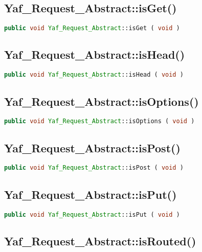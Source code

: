 \subsection{Yaf\_Request\_Abstract::isGet()}




\begin{lstlisting}[language=PHP]
public void Yaf_Request_Abstract::isGet ( void )
\end{lstlisting}




\subsection{Yaf\_Request\_Abstract::isHead()}



\begin{lstlisting}[language=PHP]
public void Yaf_Request_Abstract::isHead ( void )
\end{lstlisting}


\subsection{Yaf\_Request\_Abstract::isOptions()}





\begin{lstlisting}[language=PHP]
public void Yaf_Request_Abstract::isOptions ( void )
\end{lstlisting}


\subsection{Yaf\_Request\_Abstract::isPost()}

\begin{lstlisting}[language=PHP]
public void Yaf_Request_Abstract::isPost ( void )
\end{lstlisting}

\subsection{Yaf\_Request\_Abstract::isPut()}

\begin{lstlisting}[language=PHP]
public void Yaf_Request_Abstract::isPut ( void )
\end{lstlisting}


\subsection{Yaf\_Request\_Abstract::isRouted()}

